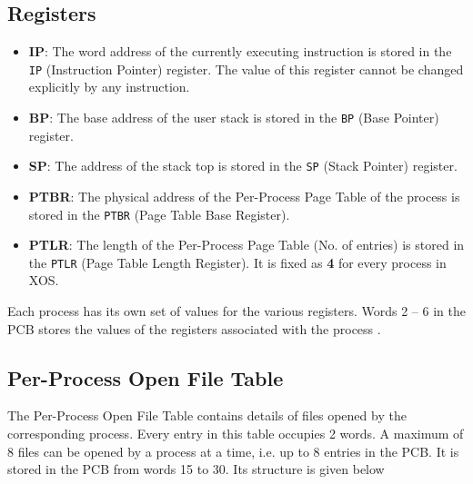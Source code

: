 \documentclass[10pt]{report}
\begin{document}
	  \subsection{Registers}
	  \label{sec:registers} 
\begin{itemize}
	\item \textbf{IP}: The word address of the currently executing instruction is stored in the \texttt{IP} (Instruction Pointer) register. The value of this register cannot be changed explicitly by any instruction. 
	
	\item \textbf{BP}:   The base address of the user stack is stored in the \texttt{BP} (Base Pointer) register. 
	\item \textbf{SP}: The address of the stack top is stored in the \texttt{SP} (Stack Pointer) register. 
	\item \textbf{PTBR}: The physical address of the Per-Process Page Table of the process is stored in the \texttt{PTBR} (Page Table Base Register).
	\item  \textbf{PTLR}: The length of the Per-Process Page Table (No. of entries) is stored in the \texttt{PTLR} (Page Table Length Register). It is fixed as \textbf{4} for every process in XOS. 
	
\end{itemize}
Each process has its own set of values for the various registers. Words  2	 -- 6 in the PCB stores the values of the registers associated with the process .
	
	
\subsection{Per-Process Open File Table} 
\label{sec:processfile table}
	 
	  The Per-Process Open File Table contains details of files opened by the corresponding process. Every entry in this table occupies 2 words. A maximum of 8 files can be opened by a process at a time, i.e. up to 8 entries in the PCB. It is stored in the PCB from words 15 to 30. Its structure is given below
\end{document}
